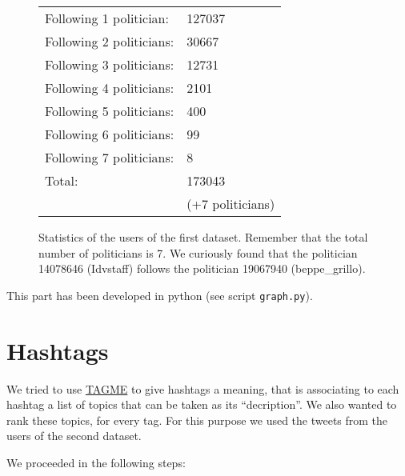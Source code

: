 \documentclass[a4paper,11pt,oneside]{article}
\begin{document}
\begin{figure}[h]
\begin{center}
	\begin{tabular}{l | l}
	Following 1 politician: & 127037\\ %
	Following 2 politicians: & 30667\\ %
	Following 3 politicians: & 12731\\ %
	Following 4 politicians: & 2101\\ %
	Following 5 politicians: & 400\\ %
	Following 6 politicians: & 99\\ %
	Following 7 politicians: & 8\\ \hline
	Total:	 & 173043 \\
	& (+7 politicians)\\ %
	\end{tabular}
\end{center}
\caption{Statistics of the users of the first dataset. Remember that the total number of politicians is 7. We curiously found that the politician 14078646 (Idvstaff) follows the politician 19067940 (beppe\_grillo).}
\end{figure}

This part has been developed in python (see script \texttt{graph.py}).

\section{Hashtags}

We tried to use \href{http://tagme.di.unipi.it/}{TAGME} to give hashtags a meaning, that is associating to each hashtag a list of topics that can be taken as its ``decription''. We also wanted to rank these topics, for every tag. For this purpose we used the tweets from the users of the second dataset.

We proceeded in the following steps:
\end{document}
